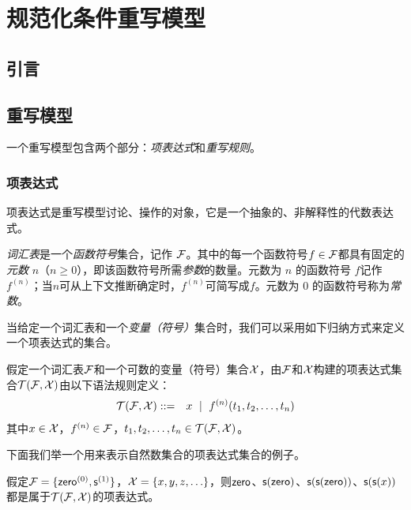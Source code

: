 \chapter{规范化条件重写模型}
\label{cha:normalrewriting}

\section{引言}


\section{重写模型} 

一个重写模型包含两个部分：\emph{项表达式}和\emph{重写规则}。

\subsection{项表达式}

项表达式是重写模型讨论、操作的对象，它是一个抽象的、非解释性的代数表达式。

\emph{词汇表}是一个\emph{函数符号}集合，记作 $\mathcal{F}$。其中的每一个函数符号$f\in\mathcal{F}$都具有固定的\emph{元数} $n$（$n\ge 0$），即该函数符号所需\emph{参数}的数量。元数为 $n$ 的函数符号 $f$记作$f^{(n)}$；当$n$可从上下文推断确定时，$f^{(n)}$可简写成$f$。元数为 $0$ 的函数符号称为\emph{常数}。

当给定一个词汇表和一个\emph{变量（符号）}集合时，我们可以采用如下归纳方式来定义一个项表达式的集合。

\begin{definition}[项表达式]
假定一个词汇表$\mathcal{F}$和一个可数的变量（符号）集合$\mathcal{X}$，由$\mathcal{F}$和$\mathcal{X}$构建的项表达式集合$\mathcal{T}(\mathcal{F},\mathcal{X})$由以下语法规则定义：
\begin{eqnarray}
    \mathcal{T}(\mathcal{F},\mathcal{X}) & ::= & x ~\mid~ f^{(n)}(t_1,t_2,\ldots,t_n) \nonumber 
\end{eqnarray}
其中$x\in\mathcal{X}$，$f^{(n)}\in\mathcal{F}$，$t_1,t_2,\ldots,t_n\in\mathcal{T}(\mathcal{F},\mathcal{X})$。
\end{definition}

下面我们举一个用来表示自然数集合的项表达式集合的例子。

\begin{example}
\label{e:nat}
假定$\mathcal{F} = \{\operatorname{\mathsf{zero}}^{(0)}, \operatorname{\mathsf{s}}^{(1)}\}$，$\mathcal{X}=\{x,y,z,\ldots\}$，则$\operatorname{\mathsf{zero}}$、$\operatorname{\mathsf{s}}(\operatorname{\mathsf{zero}})$、$\operatorname{\mathsf{s}}(\operatorname{\mathsf{s}}(\operatorname{\mathsf{zero}}))$、$\operatorname{\mathsf{s}}(\operatorname{\mathsf{s}}(x))$都是属于$\mathcal{T}(\mathcal{F},\mathcal{X})$的项表达式。
\end{example}

